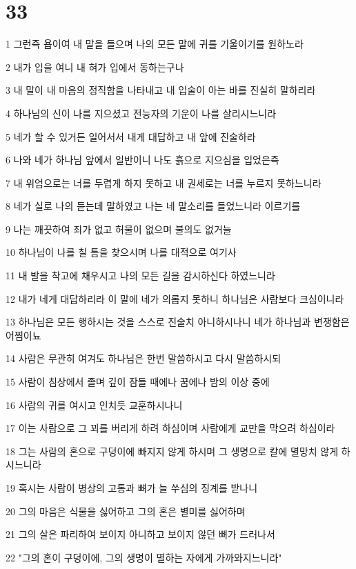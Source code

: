 \chapter{33}

\par 1 그런즉 욥이여 내 말을 들으며 나의 모든 말에 귀를 기울이기를 원하노라
\par 2 내가 입을 여니 내 혀가 입에서 동하는구나
\par 3 내 말이 내 마음의 정직함을 나타내고 내 입술이 아는 바를 진실히 말하리라
\par 4 하나님의 신이 나를 지으셨고 전능자의 기운이 나를 살리시느니라
\par 5 네가 할 수 있거든 일어서서 내게 대답하고 내 앞에 진술하라
\par 6 나와 네가 하나님 앞에서 일반이니 나도 흙으로 지으심을 입었은즉
\par 7 내 위엄으로는 너를 두렵게 하지 못하고 내 권세로는 너를 누르지 못하느니라
\par 8 네가 실로 나의 듣는데 말하였고 나는 네 말소리를 들었느니라 이르기를
\par 9 나는 깨끗하여 죄가 없고 허물이 없으며 불의도 없거늘
\par 10 하나님이 나를 칠 틈을 찾으시며 나를 대적으로 여기사
\par 11 내 발을 착고에 채우시고 나의 모든 길을 감시하신다 하였느니라
\par 12 내가 네게 대답하리라 이 말에 네가 의롭지 못하니 하나님은 사람보다 크심이니라
\par 13 하나님은 모든 행하시는 것을 스스로 진술치 아니하시나니 네가 하나님과 변쟁함은 어찜이뇨
\par 14 사람은 무관히 여겨도 하나님은 한번 말씀하시고 다시 말씀하시되
\par 15 사람이 침상에서 졸며 깊이 잠들 때에나 꿈에나 밤의 이상 중에
\par 16 사람의 귀를 여시고 인치듯 교훈하시나니
\par 17 이는 사람으로 그 꾀를 버리게 하려 하심이며 사람에게 교만을 막으려 하심이라
\par 18 그는 사람의 혼으로 구덩이에 빠지지 않게 하시며 그 생명으로 칼에 멸망치 않게 하시느니라
\par 19 혹시는 사람이 병상의 고통과 뼈가 늘 쑤심의 징계를 받나니
\par 20 그의 마음은 식물을 싫어하고 그의 혼은 별미를 싫어하며
\par 21 그의 살은 파리하여 보이지 아니하고 보이지 않던 뼈가 드러나서
\par 22 "그의 혼이 구덩이에, 그의 생명이 멸하는 자에게 가까와지느니라"
